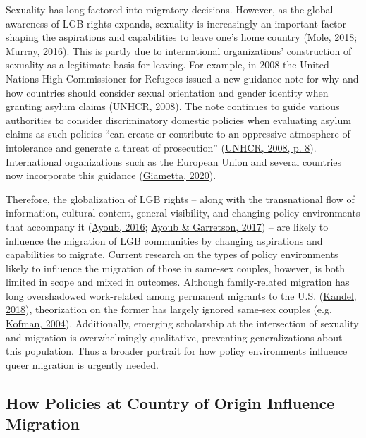 \documentclass[
  12pt,
]{article}
\begin{document}
Sexuality has long factored into migratory decisions. However, as the global awareness of LGB rights expands, sexuality is increasingly an important factor shaping the aspirations and capabilities to leave one's home country (\protect\hyperlink{ref-mole_2018a}{Mole, 2018}; \protect\hyperlink{ref-murray_2016}{Murray, 2016}). This is partly due to international organizations' construction of sexuality as a legitimate basis for leaving. For example, in 2008 the United Nations High Commissioner for Refugees issued a new guidance note for why and how countries should consider sexual orientation and gender identity when granting asylum claims (\protect\hyperlink{ref-unhcr_2008}{UNHCR, 2008}). The note continues to guide various authorities to consider discriminatory domestic policies when evaluating asylum claims as such policies ``can create or contribute to an oppressive atmosphere of intolerance and generate a threat of prosecution'' (\protect\hyperlink{ref-unhcr_2008}{UNHCR, 2008, p. 8}). International organizations such as the European Union and several countries now incorporate this guidance (\protect\hyperlink{ref-giametta_2020}{Giametta, 2020}).

Therefore, the globalization of LGB rights -- along with the transnational flow of information, cultural content, general visibility, and changing policy environments that accompany it (\protect\hyperlink{ref-ayoub_2016}{Ayoub, 2016}; \protect\hyperlink{ref-ayoub_2017}{Ayoub \& Garretson, 2017}) -- are likely to influence the migration of LGB communities by changing aspirations and capabilities to migrate. Current research on the types of policy environments likely to influence the migration of those in same-sex couples, however, is both limited in scope and mixed in outcomes. Although family-related migration has long overshadowed work-related among permanent migrants to the U.S. (\protect\hyperlink{ref-kandel_2018_familybased}{Kandel, 2018}), theorization on the former has largely ignored same-sex couples (e.g. \protect\hyperlink{ref-kofman_2004_family}{Kofman, 2004}). Additionally, emerging scholarship at the intersection of sexuality and migration is overwhelmingly qualitative, preventing generalizations about this population. Thus a broader portrait for how policy environments influence queer migration is urgently needed.\\

\hypertarget{how-policies-at-country-of-origin-influence-migration}{%
\subsection{How Policies at Country of Origin Influence Migration}\label{how-policies-at-country-of-origin-influence-migration}}
\end{document}

